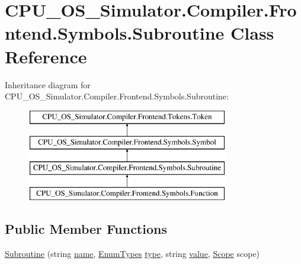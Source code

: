 \hypertarget{class_c_p_u___o_s___simulator_1_1_compiler_1_1_frontend_1_1_symbols_1_1_subroutine}{}\section{C\+P\+U\+\_\+\+O\+S\+\_\+\+Simulator.\+Compiler.\+Frontend.\+Symbols.\+Subroutine Class Reference}
\label{class_c_p_u___o_s___simulator_1_1_compiler_1_1_frontend_1_1_symbols_1_1_subroutine}
Inheritance diagram for C\+P\+U\+\_\+\+O\+S\+\_\+\+Simulator.\+Compiler.\+Frontend.\+Symbols.\+Subroutine\+:\begin{figure}[H]
\begin{center}
\leavevmode
\includegraphics[height=4.000000cm]{class_c_p_u___o_s___simulator_1_1_compiler_1_1_frontend_1_1_symbols_1_1_subroutine}
\end{center}
\end{figure}
\subsection*{Public Member Functions}
\begin{DoxyCompactItemize}
\item 
\hyperlink{class_c_p_u___o_s___simulator_1_1_compiler_1_1_frontend_1_1_symbols_1_1_subroutine_a33c0b9b5e5c0e2b30974db4bbd03222f}{Subroutine} (string \hyperlink{class_c_p_u___o_s___simulator_1_1_compiler_1_1_frontend_1_1_symbols_1_1_symbol_a04abf6b34d531519f4f515f3a51e2089}{name}, \hyperlink{namespace_c_p_u___o_s___simulator_1_1_compiler_1_1_frontend_1_1_tokens_a7c0cc43763cc9d01c7d5af34d70b96ea}{Enum\+Types} \hyperlink{class_c_p_u___o_s___simulator_1_1_compiler_1_1_frontend_1_1_tokens_1_1_token_a7ec4dbbde477cd373f8135f0c843a346}{type}, string \hyperlink{class_c_p_u___o_s___simulator_1_1_compiler_1_1_frontend_1_1_symbols_1_1_symbol_a8c243f84c23afefc2b1c26180e187013}{value}, \hyperlink{class_c_p_u___o_s___simulator_1_1_compiler_1_1_frontend_1_1_symbols_1_1_scope}{Scope} scope)
\end{DoxyCompactItemize}
